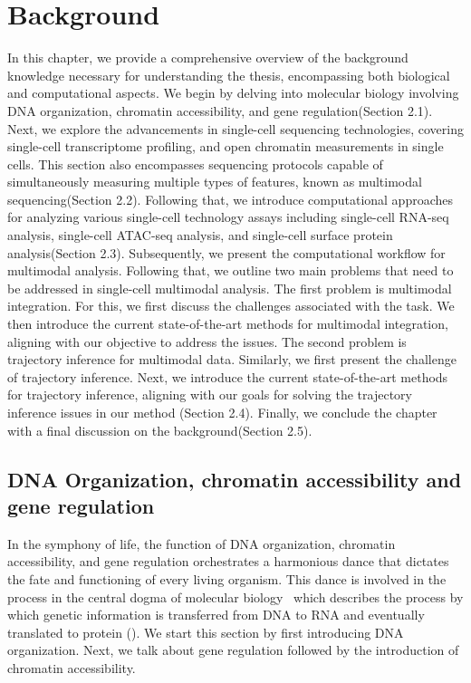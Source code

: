 %
%
\chapter{Background}
\label{cha:background}
\graphicspath{{chapter2/figs/}}

In this chapter, we provide a comprehensive overview of the background knowledge necessary for understanding the thesis, encompassing both biological and computational aspects. We begin by delving into molecular biology involving DNA organization, chromatin accessibility, and gene regulation(Section 2.1). Next, we explore the advancements in single-cell sequencing technologies, covering single-cell transcriptome profiling, and open chromatin measurements in single cells. This section also encompasses sequencing protocols capable of simultaneously measuring multiple types of features, known as multimodal sequencing(Section 2.2). Following that, we introduce computational approaches for analyzing various single-cell technology assays including single-cell RNA-seq analysis, single-cell ATAC-seq analysis, and single-cell surface protein analysis(Section 2.3). Subsequently, we present the computational workflow for multimodal analysis. Following that, we outline two main problems that need to be addressed in single-cell multimodal analysis. The first problem is multimodal integration. For this, we first discuss the challenges associated with the task. We then introduce the current state-of-the-art methods for multimodal integration, aligning with our objective to address the issues. The second problem is trajectory inference for multimodal data. Similarly, we first present the challenge of trajectory inference. Next, we introduce the current state-of-the-art methods for trajectory inference, aligning with our goals for solving the trajectory inference issues in our method (Section 2.4). Finally, we conclude the chapter with a final discussion on the background(Section 2.5).


\section{DNA Organization, chromatin accessibility and gene regulation}
\label{background:DNA_Chromatin_Regulation}
In the symphony of life, the function of DNA organization, chromatin accessibility, and gene regulation orchestrates a harmonious dance that dictates the fate and functioning of every living organism. This dance is involved in the process in the central dogma of molecular biology~\citep{crick1970central} which describes the process by which genetic information is transferred from DNA to RNA and eventually translated to protein (). We start this section by first introducing DNA organization. Next, we talk about gene regulation followed by the introduction of chromatin accessibility.

